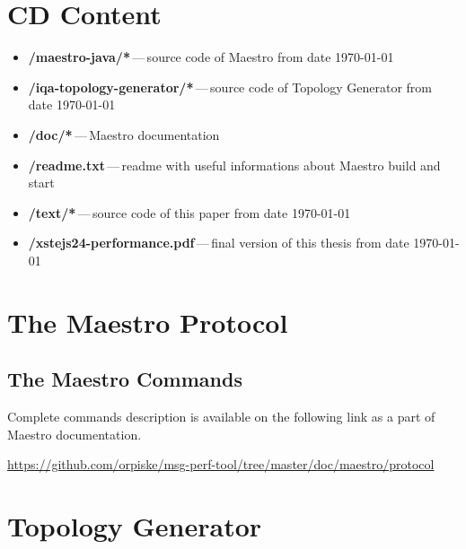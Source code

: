 

\chapter{CD Content}
\label{CD Content}

\begin{itemize}
  \item \textbf{/maestro-java/*}\,---\,source code of Maestro from date \today
  \item \textbf{/iqa-topology-generator/*}\,---\,source code of Topology Generator from date \today
  \item \textbf{/doc/*}\,---\,Maestro documentation
  \item \textbf{/readme.txt}\,---\,readme with useful informations about Maestro build and start
  \item \textbf{/text/*}\,---\,source code of this paper from date \today
  \item \textbf{/xstejs24-performance.pdf}\,---\,final version of this thesis from date \today
\end{itemize}

\chapter{The Maestro Protocol}

\section*{The Maestro Commands}
\label{AP:commands}
Complete commands description is available on the following link as a part of Maestro documentation.

\url{https://github.com/orpiske/msg-perf-tool/tree/master/doc/maestro/protocol}

\chapter{Topology Generator} %

